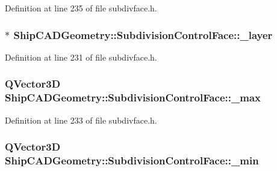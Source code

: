 Definition at line 235 of file subdivface.\-h.

\hypertarget{classShipCADGeometry_1_1SubdivisionControlFace_a83e0b0518f2206f2ceccf1e9e9894f8d}{
\subsubsection[{\-\_\-layer}]{$\ast$ Ship\-C\-A\-D\-Geometry\-::\-Subdivision\-Control\-Face\-::\-\_\-layer\hspace{0.3cm}{\ttfamily [protected]}}}\label{classShipCADGeometry_1_1SubdivisionControlFace_a83e0b0518f2206f2ceccf1e9e9894f8d}


Definition at line 231 of file subdivface.\-h.

\hypertarget{classShipCADGeometry_1_1SubdivisionControlFace_ada4bdde0addfa469e49a36d1ac99bf00}{
\subsubsection[{\-\_\-max}]{\setlength{\rightskip}{0pt plus 5cm}Q\-Vector3\-D Ship\-C\-A\-D\-Geometry\-::\-Subdivision\-Control\-Face\-::\-\_\-max\hspace{0.3cm}{\ttfamily [protected]}}}\label{classShipCADGeometry_1_1SubdivisionControlFace_ada4bdde0addfa469e49a36d1ac99bf00}


Definition at line 233 of file subdivface.\-h.

\hypertarget{classShipCADGeometry_1_1SubdivisionControlFace_abc8afda2435ea3e2b8f7d66e04eede3d}{
\subsubsection[{\-\_\-min}]{\setlength{\rightskip}{0pt plus 5cm}Q\-Vector3\-D Ship\-C\-A\-D\-Geometry\-::\-Subdivision\-Control\-Face\-::\-\_\-min\hspace{0.3cm}{\ttfamily [protected]}}}\label{classShipCADGeometry_1_1SubdivisionControlFace_abc8afda2435ea3e2b8f7d66e04eede3d}


